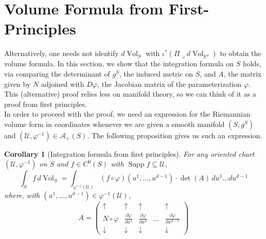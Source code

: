 \documentclass{article}
\newcommand\supp{\operatorname{Supp}}
\renewcommand\det{\operatorname{det}}
\newcommand{\p}{\partial}
\newcommand{\R}{\mathbb{R}}
\newcommand{\f}[2]{\frac{#1}{#2}}
\newcommand{\iprod}{\mathbin{\lrcorner}}
\theoremstyle{theorem}
\newtheorem{corollary}[theorem]{Corollary}
\newcommand{\Vol}{\operatorname{Vol}}
\begin{document}



\appendix
\section{Volume Formula from First-Principles}

Alternatively, one needs not identify $d\Vol_S$ with $\iota^* (\Pi \iprod d\Vol_{\R^d})$ to obtain the volume formula. In this section, we show that the integration formula on $S$ holds, via comparing the determinant of $g^S$, the induced metric on $S$, and $A$, the matrix given by $N$ adjoined with $D\varphi$, the Jacobian matrix of the parameterization $\varphi$. This (alternative) proof relies less on manifold theory, so we can think of it as a proof from first principles. \\


In order to proceed with the proof, we need an expression for the Riemannian volume form in coordinates whenever we are given a smooth manifold $(S,g^S)$ and $(\mathcal{U}, \varphi^{-1}) \in \mathcal{A}_+(S)$. The following proposition gives us such an expression.

\begin{corollary}[Integration formula from first principles]
For any oriented chart $(\mathcal{U},\varphi^{-1})$ on $S$ and $f\in C^0(S)$ with $\supp{f} \subseteq \mathcal{U}$,
\begin{equation*}
    \int_S f\,d\Vol_S = \int_{\varphi^{-1}(\mathcal{U})} (f\circ \varphi)(u^1,\dots,u^{d-1}) \cdot {\det{(A)}}\,du^1\dots du^{d-1} 
\end{equation*}
where, with $(u^1,\dots, u^{d-1}) \in \varphi^{-1}(\mathcal{U})$, 
\begin{equation*}
    A = 
    \begin{pmatrix}
    \uparrow &\uparrow & \uparrow &   &\uparrow \\ 
    N \circ \varphi &\f{\p \varphi}{\p x^1}& \f{\p \varphi}{\p x^2}  &\dots&\f{\p \varphi}{\p x^{d-1}}\\
    \downarrow  &\downarrow  & \downarrow &    &\downarrow   
    \end{pmatrix}
\end{equation*}
\end{corollary}
\end{document}

